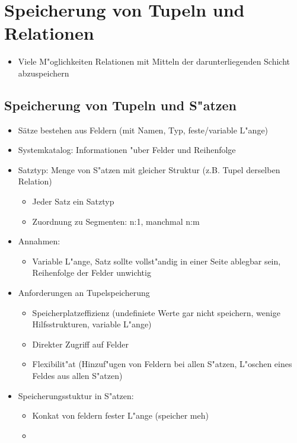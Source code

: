 \documentclass[a4paper, 12pt]{scrartcl}
\begin{document}
\section{Speicherung von Tupeln und Relationen}
\begin{itemize}
	\item
		Viele M"oglichkeiten Relationen mit Mitteln der darunterliegenden Schicht abzuspeichern
\end{itemize}

\subsection{Speicherung von Tupeln und S"atzen}
\begin{itemize}
	\item
		Sätze bestehen aus Feldern (mit Namen, Typ, feste/variable L"ange)
	\item
		Systemkatalog: Informationen "uber Felder und Reihenfolge
	\item
		Satztyp: Menge von S"atzen mit gleicher Struktur (z.B. Tupel derselben Relation)
		\begin{itemize}
			\item
				Jeder Satz ein Satztyp
			\item
				Zuordnung zu Segmenten: n:1, manchmal n:m
		\end{itemize}
	\item
		Annahmen: 
		\begin{itemize}
			\item
				Variable L"ange, Satz sollte vollst"andig in einer Seite ablegbar sein, Reihenfolge der Felder unwichtig
		\end{itemize}
	\item
		Anforderungen an Tupelspeicherung
		\begin{itemize}
			\item
				Speicherplatzeffizienz (undefiniete Werte gar nicht speichern, wenige Hilfsstrukturen, variable L"ange)
			\item
				Direkter Zugriff auf Felder
			\item
				Flexibilit"at (Hinzuf"ugen von Feldern bei allen S"atzen, L"oschen eines Feldes aus allen S"atzen)
		\end{itemize}
	\item
		Speicherungsstuktur in S"atzen:
		\begin{itemize}
			\item
				Konkat von feldern fester L"ange (speicher meh)
			\item

\end{itemize}
\end{itemize}
\end{document}
